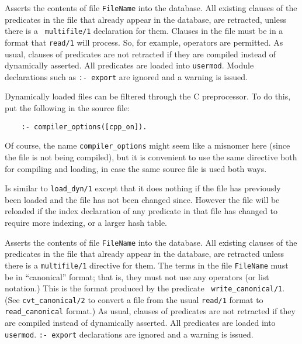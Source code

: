 \begin{description}
\label{load_dyn/1}
    Asserts the contents of file {\tt FileName} into the database.
    All existing clauses of the predicates in the file that already
    appear in the database, are retracted, unless there is a {\tt
    multifile/1} declaration for them.  Clauses in the file must be
    in a format that {\tt read/1} will process.  So, for example,
    operators are permitted.  As usual, clauses of predicates are not
    retracted if they are compiled instead of dynamically asserted.
    All predicates are loaded into {\tt usermod}.  Module declarations
    such as {\tt :- export} are ignored and a warning is issued.

    Dynamically loaded files can be filtered through the C preprocessor.
    To do this, put the following in the source file: 
    \begin{verbatim}
    :- compiler_options([cpp_on]).      
    \end{verbatim}
    Of course, the name \verb|compiler_options| might seem like a misnomer
    here (since the file is not being compiled), but it is convenient to
    use the same directive both for compiling and loading, in case the same
    source file is used both ways.

    Is similar to {\tt load\_dyn/1} except that it does nothing if the
    file has previously been loaded and the file has not been changed
    since.  However the file will be reloaded if the index declaration of
    any predicate in that file has changed to require more indexing, or a
    larger hash table.

    Asserts the contents of file {\tt FileName} into the database.
    All existing clauses of the predicates in the file that already appear
    in the database, are retracted unless there is a {\tt multifile/1}
    directive for them.  The terms in the file {\tt FileName} must be in
    ``canonical'' format; that is, they must not use any operators (or
    list notation.) This is the format produced by the predicate {\tt
    write\_canonical/1}. (See {\tt cvt\_canonical/2} to convert a file from
    the usual {\tt read/1} format to {\tt read\_canonical} format.)  As
    usual, clauses of predicates are not retracted if they are compiled
    instead of dynamically asserted. All predicates are loaded into {\tt
    usermod}.  {\tt :- export} declarations are ignored and a warning is
    issued.


\end{description}
